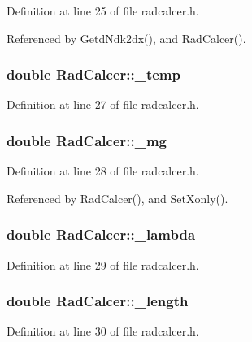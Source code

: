 Definition at line 25 of file radcalcer.h.

Referenced by GetdNdk2dx(), and RadCalcer().
\subsubsection{\setlength{\rightskip}{0pt plus 5cm}double {\bf RadCalcer::\_\-temp}\hspace{0.3cm}{\tt  [private]}}\label{classRadCalcer_9c8bc38ebea12dbb996071560b28f9eb}




Definition at line 27 of file radcalcer.h.
\subsubsection{\setlength{\rightskip}{0pt plus 5cm}double {\bf RadCalcer::\_\-mg}\hspace{0.3cm}{\tt  [private]}}\label{classRadCalcer_8bbc6f788e02386e6799aa6658700ba1}




Definition at line 28 of file radcalcer.h.

Referenced by RadCalcer(), and SetXonly().
\subsubsection{\setlength{\rightskip}{0pt plus 5cm}double {\bf RadCalcer::\_\-lambda}\hspace{0.3cm}{\tt  [private]}}\label{classRadCalcer_0b268abba738ac390e83f14cdc641e34}




Definition at line 29 of file radcalcer.h.
\subsubsection{\setlength{\rightskip}{0pt plus 5cm}double {\bf RadCalcer::\_\-length}\hspace{0.3cm}{\tt  [private]}}\label{classRadCalcer_635c673009cc00a1dceaa5e24a48b90c}




Definition at line 30 of file radcalcer.h.

